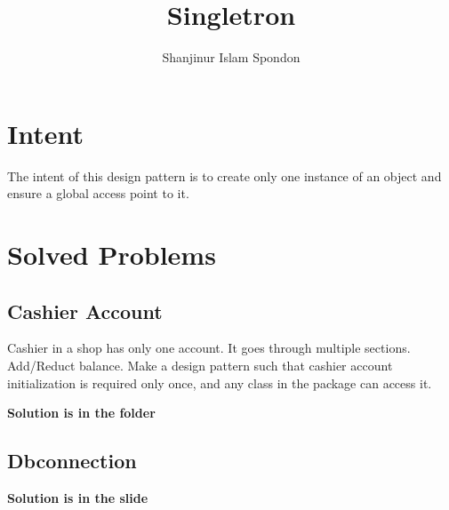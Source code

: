\documentclass{article}
\title{Singletron}
\author{Shanjinur Islam Spondon}
\begin{document}
	\maketitle 
	\section{Intent}
	The intent of this design pattern is to create only one instance of an object and ensure a global access point to it.\\
	\section{Solved Problems}
	\subsection{Cashier Account}
	Cashier in a shop has only one account. It goes through multiple sections. Add/Reduct balance. Make a design pattern such that cashier account initialization is required only once, and any class in the package can access it.

	\textbf{Solution is in the folder}

	\subsection{Dbconnection}

	\textbf{Solution is in the slide}
\end{document}
